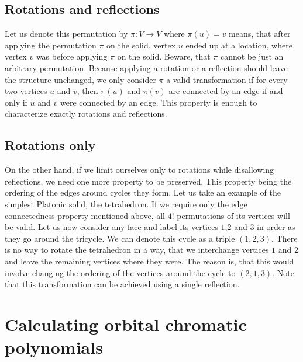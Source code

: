 \begin{highlight}
\subsection{Rotations and reflections}

Let us denote this permutation by $\pi : V \rightarrow V$ where $\pi(u) = v$ means, that after applying the permutation $\pi$ on the solid, vertex $u$ ended up at a location, where vertex $v$ was before applying $\pi$ on the solid. Beware, that $\pi$ cannot be just an arbitrary permutation. Because applying a rotation or a reflection should leave the structure unchanged, we only consider $\pi$ a valid transformation if for every two vertices $u$ and $v$, then $\pi(u)$ and $\pi(v)$ are connected by an edge if and only if $u$ and $v$ were connected by an edge. This property is enough to characterize exactly rotations and reflections.

\subsection{Rotations only}

On the other hand, if we limit ourselves only to rotations while disallowing reflections, we need one more property to be preserved. This property being the ordering of the edges around cycles they form. Let us take an example of the simplest Platonic solid, the tetrahedron. If we require only the edge connectedness property mentioned above, all $4!$ permutations of its vertices will be valid. Let us now consider any face and label its vertices $1$,$2$ and $3$ in order as they go around the tricycle. We can denote this cycle as a triple $(1,2,3)$. There is no way to rotate the tetrahedron in a way, that we interchange vertices $1$ and $2$ and leave the remaining vertices where they were. The reason is, that this would involve changing the ordering of the vertices around the cycle to $(2,1,3)$. Note that this transformation can be achieved using a single reflection.

\section{Calculating orbital chromatic polynomials}


\end{highlight}
